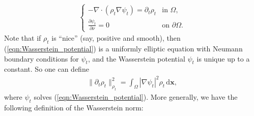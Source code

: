 \documentclass[11pt]{book}
\newcommand{\dx}{\mathrm{d}\mathbf{x}}
\begin{document}
\begin{align}\label{eqn:Wasserstein_potential}
    \begin{cases}
        -\nabla\cdot(\rho_t \nabla \psi_t) = \partial_t \rho_t & \text{in } \Omega, \\
        \frac{\partial \psi_t}{\partial \nu} = 0 & \text{on } \partial \Omega.
    \end{cases} 
\end{align}
Note that if \( \rho_t \) is “nice” (say, positive and smooth), then (\ref{eqn:Wasserstein_potential}) is a uniformly elliptic equation with Neumann boundary conditions for \( \psi_t \), and the Wasserstein potential \( \psi_t \) is unique up to a constant. So one can define
\begin{align*}
    \| \partial_t \rho_t \|^2_{\rho_t} = \int_\Omega |\nabla \psi_t|^2 \rho_t \, \dx,
\end{align*}
where \( \psi_t \) solves (\ref{eqn:Wasserstein_potential}). More generally, we have the following definition of the Wasserstein norm:
\end{document}
